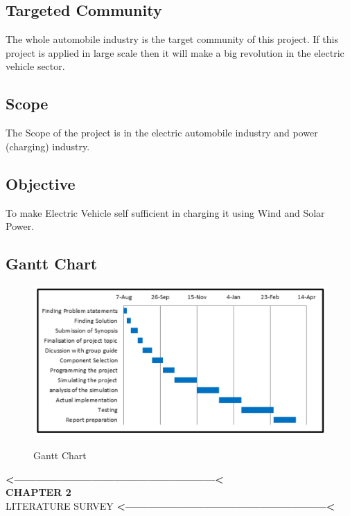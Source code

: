 \documentclass[a4paper,12pt]{article}
\begin{document}
\subsection{Targeted Community}
The whole automobile industry is the target community of this project. If this project is applied in large scale then it will make a big revolution in the electric vehicle sector.

\subsection{Scope}
The Scope of the project is in the electric automobile industry and power (charging) industry.

\subsection{Objective}
To make Electric Vehicle self sufficient in charging it using Wind and Solar Power.

\newpage
\subsection{Gantt Chart}
\begin{figure}[!h]
\centering
\includegraphics[scale=0.5]{gc.png}\\
\caption{Gantt Chart}
\end{figure}


\newpage
\thispagestyle{empty}
\vspace*{0.25\textheight}
\begin{center}
\begin{center}
{\bfseries\LARGE <------------------------------------------------------<}\\
{\bfseries\LARGE CHAPTER 2}\\[2cm]


{\scshape\Huge LITERATURE SURVEY}
{\bfseries\LARGE <------------------------------------------------------<}
\end{center}
\end{center}
\end{document}

